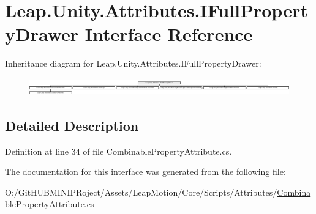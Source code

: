 \hypertarget{interface_leap_1_1_unity_1_1_attributes_1_1_i_full_property_drawer}{}\section{Leap.\+Unity.\+Attributes.\+I\+Full\+Property\+Drawer Interface Reference}
\label{interface_leap_1_1_unity_1_1_attributes_1_1_i_full_property_drawer}
Inheritance diagram for Leap.\+Unity.\+Attributes.\+I\+Full\+Property\+Drawer\+:\begin{figure}[H]
\begin{center}
\leavevmode
\includegraphics[height=0.762943cm]{interface_leap_1_1_unity_1_1_attributes_1_1_i_full_property_drawer}
\end{center}
\end{figure}


\subsection{Detailed Description}


Definition at line 34 of file Combinable\+Property\+Attribute.\+cs.



The documentation for this interface was generated from the following file\+:\begin{DoxyCompactItemize}
\item 
O\+:/\+Git\+H\+U\+B\+M\+I\+N\+I\+P\+Roject/\+Assets/\+Leap\+Motion/\+Core/\+Scripts/\+Attributes/\mbox{\hyperlink{_combinable_property_attribute_8cs}{Combinable\+Property\+Attribute.\+cs}}\end{DoxyCompactItemize}
